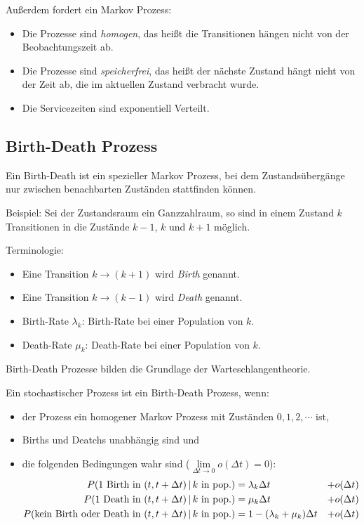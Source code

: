 			Außerdem fordert ein Markov Prozess:
			\begin{itemize}
				\item Die Prozesse sind \textit{homogen}, das heißt die Transitionen hängen nicht von der Beobachtungszeit ab.
				\item Die Prozesse sind \textit{speicherfrei}, das heißt der nächste Zustand hängt nicht von der Zeit ab, die im aktuellen Zustand verbracht wurde.
				\item Die Servicezeiten sind exponentiell Verteilt.
			\end{itemize}

		\subsection{Birth-Death Prozess} %
			Ein Birth-Death ist ein spezieller Markov Prozess, bei dem Zustandsübergänge nur zwischen benachbarten Zuständen stattfinden können.

			Beispiel: Sei der Zustandsraum ein Ganzzahlraum, so sind in einem Zustand \( k \) Transitionen in die Zustände \( k - 1 \), \( k \) und \( k + 1 \) möglich.

			Terminologie:
			\begin{itemize}
				\item Eine Transition \( k \rightarrow (k + 1) \) wird \textit{Birth} genannt.
				\item Eine Transition \( k \rightarrow (k - 1) \) wird \textit{Death} genannt.
				\item Birth-Rate \( \lambda _ k \): Birth-Rate bei einer Population von \(k\).
				\item Death-Rate \( \mu _ k \): Death-Rate bei einer Population von \(k\).
			\end{itemize}

			Birth-Death Prozesse bilden die Grundlage der Warteschlangentheorie.

			Ein stochastischer Prozess ist ein Birth-Death Prozess, wenn:
			\begin{itemize}
				\item der Prozess ein homogener Markov Prozess mit Zuständen \( 0, 1, 2, \cdots \) ist,
				\item Births und Deatchs unabhängig sind und
				\item die folgenden Bedingungen wahr sind (\( \lim\limits _ { \Delta t \to 0 } o(\Delta t) = 0 \)): 
					\begin{align*}
						P(1 \text{ Birth in } (t, t + \Delta t) \,\vert\, k \text{ in pop.})              & = \lambda _ k \Delta t                 & + o(\Delta t) \\
						P(1 \text{ Death in } (t, t + \Delta t) \,\vert\, k \text{ in pop.})              & = \mu _ k \Delta t                     & + o(\Delta t) \\
						P(\text{kein Birth oder Death in } (t, t + \Delta t) \,\vert\, k \text{ in pop.}) & = 1 - (\lambda _ k + \mu _ k) \Delta t & + o(\Delta t)
					\end{align*}
			\end{itemize}

